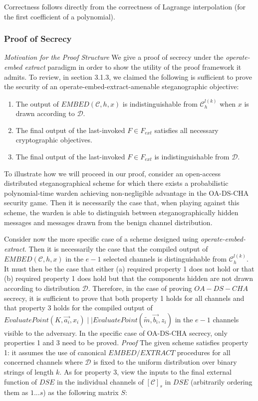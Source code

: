 \documentclass{article}
\begin{document}
Correctness follows directly from the correctness of Lagrange interpolation (for the first coefficient of a polynomial).

\subsubsection{Proof of Secrecy}

\noindent \textit{Motivation for the Proof Structure }  We give a proof of secrecy under the 
\textit{operate-embed extract} paradigm in order to show the utility of the proof 
framework it admits.  To review, in section 3.1.3, we claimed the following is sufficient to prove the security of an 
operate-embed-extract-amenable steganographic objective:

\begin{enumerate}
\item{The output of $EMBED(\mathcal{C}, h, x)$ is indistinguishable from $\mathcal{C}_h^{l(k)}$ when $x$ is drawn according to $\mathcal{D}$.}
\item{The final output of the last-invoked $F \in F_{ext}$ satisfies all necessary cryptographic objectives.}
\item{The final output of the last-invoked $F \in F_{ext}$ is indistinguishable from $\mathcal{D}$.} 
\end{enumerate}

To illustrate how we will proceed in our proof, consider an open-access distributed steganographical scheme for which there exists 
a probabilistic polynomial-time warden achieving non-negligible advantage in the OA-DS-CHA security game.  Then it is necessarily the 
case that, when playing against this scheme, the warden is able to distinguish between steganographically hidden messages and messages 
drawn from the benign channel distribution.  

Consider now the more specific case of a scheme designed using \textit{operate-embed-extract}.  Then it is necessarily the case 
that the compiled output of $EMBED(\mathcal{C}, h, x)$ in the $e-1$ selected channels is distinguishable from $\mathcal{C}_h^{l(k)}$.  It must then 
be the case that either (a) required property 1 does not hold or that (b) required property 1 does hold but that the components hidden 
are not drawn according to distribution $\mathcal{D}$.  Therefore, in the case of proving $OA-DS-CHA$ secrecy, it is sufficient to prove 
that both property 1 holds for all channels and that property 3 holds for the compiled output of 
$EvaluatePoint(K, \vec{a_i}, x_i) \mid \mid EvaluatePoint(\tilde{m}, \vec{b_i}, z_i)$ in the $e-1$ channels visible to the adversary.  
In the specific case of OA-DS-CHA secrecy, only properties 1 and 3 need to be proved.
\newline\newline
\noindent \textit{Proof }  The given scheme satisfies property 1: it assumes the use of canonical $EMBED/EXTRACT$ procedures for 
all concerned channels where $\mathcal{D}$ is fixed to the uniform distribution over binary strings of length $k$.  
As for property 3, view the inputs to the final external function of $DSE$ in the individual channels of $[\mathcal{C}]_s$ in $DSE$ (arbitrarily ordering them as $1...s$) 
as the following matrix $S$:
\end{document}
